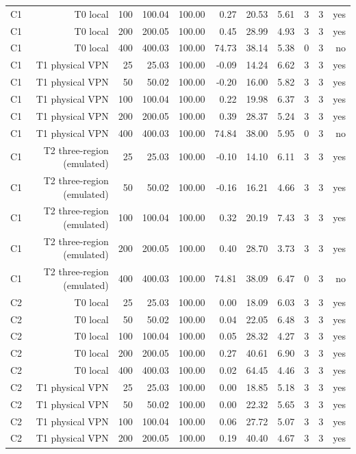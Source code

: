 \begin{table}[t]
\begin{tabular}{lrrrrrrrrrr}
C1 & T0 local & 100 & 100.04 & 100.00 & 0.27 & 20.53 & 5.61 & 3 & 3 & yes \\
C1 & T0 local & 200 & 200.05 & 100.00 & 0.45 & 28.99 & 4.93 & 3 & 3 & yes \\
C1 & T0 local & 400 & 400.03 & 100.00 & 74.73 & 38.14 & 5.38 & 0 & 3 & no \\
C1 & T1 physical VPN & 25 & 25.03 & 100.00 & -0.09 & 14.24 & 6.62 & 3 & 3 & yes \\
C1 & T1 physical VPN & 50 & 50.02 & 100.00 & -0.20 & 16.00 & 5.82 & 3 & 3 & yes \\
C1 & T1 physical VPN & 100 & 100.04 & 100.00 & 0.22 & 19.98 & 6.37 & 3 & 3 & yes \\
C1 & T1 physical VPN & 200 & 200.05 & 100.00 & 0.39 & 28.37 & 5.24 & 3 & 3 & yes \\
C1 & T1 physical VPN & 400 & 400.03 & 100.00 & 74.84 & 38.00 & 5.95 & 0 & 3 & no \\
C1 & T2 three-region (emulated) & 25 & 25.03 & 100.00 & -0.10 & 14.10 & 6.11 & 3 & 3 & yes \\
C1 & T2 three-region (emulated) & 50 & 50.02 & 100.00 & -0.16 & 16.21 & 4.66 & 3 & 3 & yes \\
C1 & T2 three-region (emulated) & 100 & 100.04 & 100.00 & 0.32 & 20.19 & 7.43 & 3 & 3 & yes \\
C1 & T2 three-region (emulated) & 200 & 200.05 & 100.00 & 0.40 & 28.70 & 3.73 & 3 & 3 & yes \\
C1 & T2 three-region (emulated) & 400 & 400.03 & 100.00 & 74.81 & 38.09 & 6.47 & 0 & 3 & no \\
C2 & T0 local & 25 & 25.03 & 100.00 & 0.00 & 18.09 & 6.03 & 3 & 3 & yes \\
C2 & T0 local & 50 & 50.02 & 100.00 & 0.04 & 22.05 & 6.48 & 3 & 3 & yes \\
C2 & T0 local & 100 & 100.04 & 100.00 & 0.05 & 28.32 & 4.27 & 3 & 3 & yes \\
C2 & T0 local & 200 & 200.05 & 100.00 & 0.27 & 40.61 & 6.90 & 3 & 3 & yes \\
C2 & T0 local & 400 & 400.03 & 100.00 & 0.02 & 64.45 & 4.46 & 3 & 3 & yes \\
C2 & T1 physical VPN & 25 & 25.03 & 100.00 & 0.00 & 18.85 & 5.18 & 3 & 3 & yes \\
C2 & T1 physical VPN & 50 & 50.02 & 100.00 & 0.00 & 22.32 & 5.65 & 3 & 3 & yes \\
C2 & T1 physical VPN & 100 & 100.04 & 100.00 & 0.06 & 27.72 & 5.07 & 3 & 3 & yes \\
C2 & T1 physical VPN & 200 & 200.05 & 100.00 & 0.19 & 40.40 & 4.67 & 3 & 3 & yes \\

\end{tabular}
\end{table}
